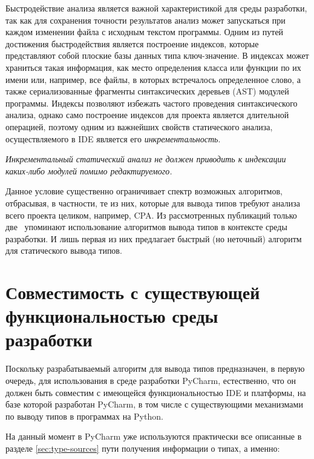 Быстродействие анализа является важной характеристикой для среды разработки, так
как для сохранения точности результатов анализ может запускаться
при каждом изменении файла с исходным текстом программы. Одним из путей
достижения быстродействия является построение индексов, которые представляют
собой плоские базы данных типа ключ-значение. В индексах может храниться такая
информация, как место определения класса или функции по их имени или,
например, все файлы, в которых встречалось определенное слово, а также
сериализованные фрагменты синтаксических деревьев (AST) модулей программы. Индексы
позволяют избежать частого проведения синтаксического анализа, однако само
построение индексов для проекта является длительной операцией, поэтому одним из
важнейших свойств статического анализа, осуществляемого в IDE является его
\emph{инкрементальность}.


\emph{Инкрементальный статический анализ не должен приводить к индексации 
 каких-либо модулей помимо редактируемого.}

Данное условие существенно ограничивает спектр возможных алгоритмов, отбрасывая,
в частности, те из них, которые для вывода типов требуют анализа всего проекта
целиком, например, CPA. Из рассмотренных публикаций только две~\cite{Pluquet2009,Haupt2011}
упоминают использование алгоритмов вывода типов в контексте среды разработки. И
лишь первая из них предлагает быстрый (но неточный) алгоритм для статического
вывода типов.

\section{Совместимость с существующей функциональностью среды разработки}
\label{sec:compatibility-requirement}

Поскольку разрабатываемый алгоритм для вывода типов предназначен, в первую
очередь, для использования в среде разработки PyCharm, естественно, что он должен
быть совместим с имеющейся функциональностью IDE и платформы, на базе которой
разработан PyCharm, в том числе с существующими механизмами по выводу типов в
программах на Python. 

На данный момент в PyCharm уже используются практически все описанные в разделе
\ref{sec:type-sources} пути получения информации о типах, а именно:

